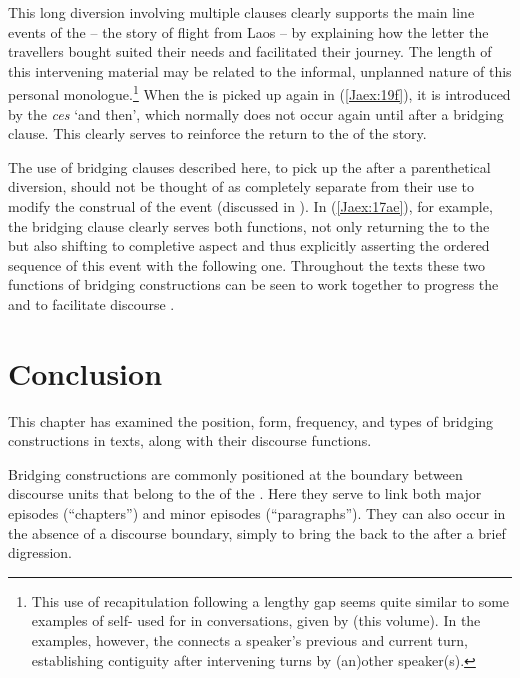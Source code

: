 \documentclass[output=paper]{LSP/langsci}
\begin{document}
This long diversion involving multiple clauses clearly supports the main line events of the  – the story of flight from Laos – by explaining how the letter the travellers bought suited their needs and facilitated their journey. The length of this intervening material may be related to the informal, unplanned nature of this personal monologue.\footnote{ This use of recapitulation following a lengthy gap seems quite similar to some examples of self- used for  in  conversations, given by \citeauthor{alvanoudi18} (this volume). In the  examples, however, the  connects a speaker’s previous and current turn, establishing contiguity after intervening turns by (an)other speaker(s).} When the  is picked up again in (\ref{Jaex:19f}), it is introduced by the   \textit{ces} `and then', which normally does not occur again until after a bridging clause. This clearly serves to reinforce the return to the   of the story.

The use of bridging clauses described here, to pick up the  after a parenthetical diversion, should not be thought of as completely separate from their use to modify the construal of the event (discussed in ). In (\ref{Jaex:17ae}), for example, the bridging clause clearly serves both functions, not only returning the  to the  but also shifting to completive aspect and thus explicitly asserting the ordered sequence of this event with the following one. Throughout the texts these two functions of bridging constructions can be seen to work together to progress the  and to facilitate discourse . 

\section{Conclusion} 
\label{Jasec:Conclusion}

This chapter has examined the position, form, frequency, and types of bridging constructions in   texts, along with their discourse functions. 

Bridging constructions are commonly positioned at the boundary between discourse units that belong to the  of the . Here they serve to link both major episodes (``chapters'') and minor episodes (``paragraphs''). They can also occur in the absence of a discourse boundary, simply to bring the  back to the  after a brief digression. 
\end{document}
